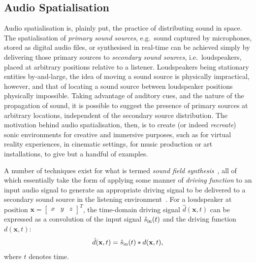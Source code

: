 \subsection{Audio Spatialisation}\label{subsec:audio-spatialisation}

Audio spatialisation is, plainly put, the practice of distributing sound in
space.
The spatialisation of \textit{primary sound sources}, e.g.\ sound
captured by microphones, stored as digital audio files, or synthesised in
real-time can be achieved simply by delivering those primary sources to
\textit{secondary sound sources}, i.e.\ loudspeakers, placed at arbitrary
positions relative to a listener.
Loudspeakers being stationary entities by-and-large, the idea of moving a sound
source is physically impractical, however, and that of locating a sound source
between loudspeaker positions physically impossible.
Taking advantage of auditory cues, and the nature of the propagation of sound,
it is possible to suggest the presence of primary sources at arbitrary
locations, independent of the secondary source distribution.
The motivation behind audio spatialisation, then, is to create (or indeed
\textit{recreate}) sonic environments for creative and immersive purposes, such
as for virtual reality experiences, in cinematic settings, for music production
or art installations, to give but a handful of examples.

A number of techniques exist for what is termed \textit{sound field
synthesis}~\citep{ahrens_analytic_2012,nicol_sound_2017}, all of which
essentially take the form of applying some manner of \textit{driving function}
to an input audio signal to generate an appropriate driving signal to be
delivered to a secondary sound source in the listening
environment~\citep{ahrens_analytic_2012}.
For a loudspeaker at position $\mathbf{x} = \begin{bmatrix}
                                                x & y & z
\end{bmatrix}^T$, the time-domain driving signal $\hat{d}(\mathbf{x},t)$
can be expressed as a convolution of the input signal $\hat{s}_{\text{in}}(t)$ and the
driving function $d(\mathbf{x},t)$:
\begin{equation}
    \label{eq:driving-signal-time}
    \hat{d}(\mathbf{x},t) = \hat{s}_{\text{in}}(t) \ast d(\mathbf{x},t),
\end{equation}
where $t$ denotes time.


